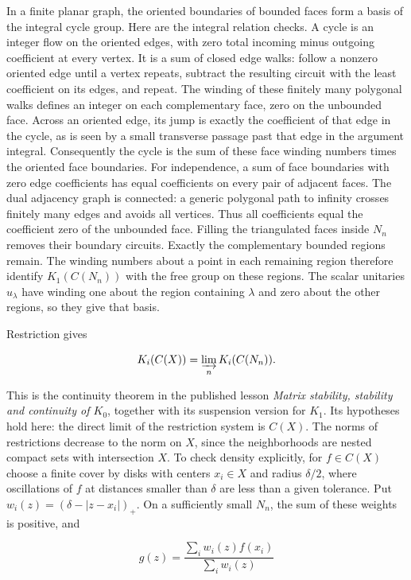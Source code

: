 \documentclass[
  11pt,
]{article}
\begin{document}
In a finite planar graph, the oriented boundaries of bounded faces form
a basis of the integral cycle group. Here are the integral relation
checks. A cycle is an integer flow on the oriented edges, with zero
total incoming minus outgoing coefficient at every vertex. It is a sum
of closed edge walks: follow a nonzero oriented edge until a vertex
repeats, subtract the resulting circuit with the least coefficient on
its edges, and repeat. The winding of these finitely many polygonal
walks defines an integer on each complementary face, zero on the
unbounded face. Across an oriented edge, its jump is exactly the
coefficient of that edge in the cycle, as is seen by a small transverse
passage past that edge in the argument integral. Consequently the cycle
is the sum of these face winding numbers times the oriented face
boundaries. For independence, a sum of face boundaries with zero edge
coefficients has equal coefficients on every pair of adjacent faces. The
dual adjacency graph is connected: a generic polygonal path to infinity
crosses finitely many edges and avoids all vertices. Thus all
coefficients equal the coefficient zero of the unbounded face. Filling
the triangulated faces inside \(N_n\) removes their boundary circuits.
Exactly the complementary bounded regions remain. The winding numbers
about a point in each remaining region therefore identify
\(K_1(C(N_n))\) with the free group on these regions. The scalar
unitaries \(u_\lambda\) have winding one about the region containing
\(\lambda\) and zero about the other regions, so they give that basis.

Restriction gives

\[
K_i(C(X))=\varinjlim_n K_i(C(N_n)).
\]

This is the continuity theorem in the published lesson \emph{Matrix
stability, stability and continuity of \(K_0\)}, together with its
suspension version for \(K_1\). Its hypotheses hold here: the direct
limit of the restriction system is \(C(X)\). The norms of restrictions
decrease to the norm on \(X\), since the neighborhoods are nested
compact sets with intersection \(X\). To check density explicitly, for
\(f\in C(X)\) choose a finite cover by disks with centers \(x_i\in X\)
and radius \(\delta/2\), where oscillations of \(f\) at distances
smaller than \(\delta\) are less than a given tolerance. Put
\(w_i(z)=(\delta-|z-x_i|)_+\). On a sufficiently small \(N_n\), the sum
of these weights is positive, and

\[
g(z)=\frac{\sum_iw_i(z)f(x_i)}{\sum_iw_i(z)}
\]
\end{document}
